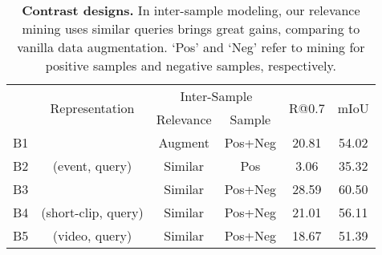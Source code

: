 \begin{table}[t]
\footnotesize
\setlength\tabcolsep{4pt}
\centering
\caption{\footnotesize \textbf{Contrast designs.} In inter-sample modeling, our relevance mining uses similar queries brings great gains, comparing to vanilla data augmentation. `Pos' and `Neg' refer to mining for positive samples and negative samples, respectively.}
\vspace{-0.3cm}
\begin{tabular}{c|c|cc|cc}
\toprule 
\multirow{2}{*}{} & \multirow{2}{*}{Representation} & \multicolumn{2}{c|}{Inter-Sample} & \multirow{2}{*}{R@0.7} & \multirow{2}{*}{mIoU} \\ \cline{3-4}
 &  & Relevance & Sample &  &    \\ \hline \hline
B1 & \multirow{3}{*}{(event, query)} & Augment & Pos+Neg & 20.81 & 54.02  \\
B2 &  & Similar & Pos & 3.06 &  35.32  \\
B3 &  & Similar & Pos+Neg & 28.59 & 60.50   \\   \hline
B4 &  (short-clip, query) & Similar & Pos+Neg & 21.01 &  56.11  \\
B5 & (video, query) & Similar & Pos+Neg & 18.67 & 51.39  \\ 
\bottomrule
\end{tabular}
\vspace{-0.4cm}
\label{tab:representation}
\end{table}
